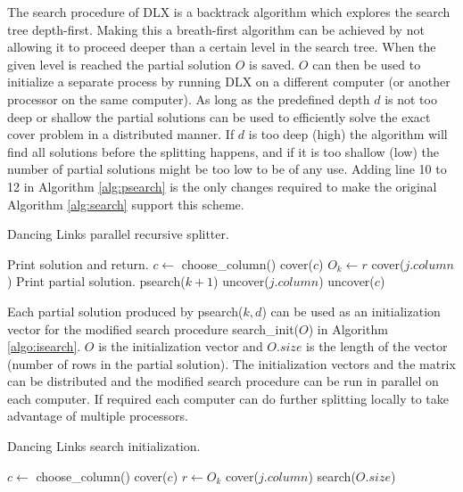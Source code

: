 The search procedure of DLX is a backtrack algorithm which explores the search tree depth-first.
Making this a breath-first algorithm can be achieved by not allowing it to proceed deeper than a certain level in the search tree.
When the given level is reached the partial solution $O$ is saved.
$O$ can then be used to initialize a separate process by running DLX on a different computer (or another processor on the same computer).
As long as the predefined depth $d$ is not too deep or shallow the partial solutions can be used to efficiently solve the exact cover problem in a distributed manner.
If $d$ is too deep (high) the algorithm will find all solutions before the splitting happens, and if it is too shallow (low) the number of partial solutions might be too low to be of any use.
Adding line 10 to 12 in Algorithm \ref{alg:psearch} is the only changes required to make the original Algorithm \ref{alg:search} support this scheme.
\begin{algorithm}[htbp]
	\caption{Dancing Links parallel recursive splitter.}
	\label{alg:psearch}
	\begin{distribalgo}[1]
				\STATE Print solution and return.  
			\ENDIF
			\STATE $c \leftarrow$ choose\_column()
			\STATE cover($c$)
				\STATE $O_k \leftarrow r$  
					\STATE cover($j.column$)
				\ENDFOR
					\STATE Print partial solution.  
				\ELSE
					\STATE psearch($k + 1$)
				\ENDIF
					\STATE uncover($j.column$)
				\ENDFOR
			\ENDFOR
			\STATE uncover($c$)
		\ENDPROC
	\end{distribalgo}
\end{algorithm}

Each partial solution produced by psearch($k, d$) can be used as an initialization vector for the modified search procedure search\_init($O$) in Algorithm \ref{algo:isearch}.
$O$ is the initialization vector and $O.size$ is the length of the vector (number of rows in the partial solution).
The initialization vectors and the matrix can be distributed and the modified search procedure can be run in parallel on each computer.
If required each computer can do further splitting locally to take advantage of multiple processors.
\begin{algorithm}[htbp]
	\caption{Dancing Links search initialization.}
	\label{algo:isearch}
	\begin{distribalgo}[1]
				\STATE $c \leftarrow$ choose\_column()
				\STATE cover($c$)
				\STATE $r \leftarrow O_k$
					\STATE cover($j.column$)
				\ENDFOR
			\ENDFOR
			\STATE search($O.size$)  
		\ENDPROC
	\end{distribalgo}
\end{algorithm}

